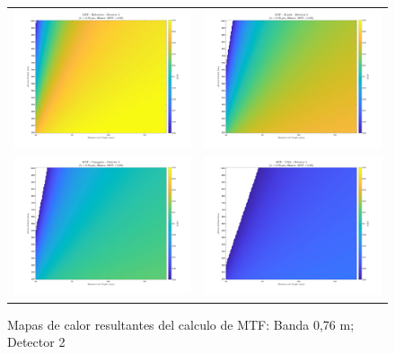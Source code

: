 \begin{landscape}
\begin{figure}[p]
\centering
\setlength{\tabcolsep}{2pt}
\renewcommand{\arraystretch}{0}

\begin{tabular}{cc}
\includegraphics[width=0.48\linewidth]{4.Payload/MTF/MTF_Lambda3_Detector5_Telescopio1_heatmap.jpg} &
\includegraphics[width=0.48\linewidth]{4.Payload/MTF/MTF_Lambda3_Detector5_Telescopio2_heatmap.jpg} \\
\includegraphics[width=0.48\linewidth]{4.Payload/MTF/MTF_Lambda3_Detector5_Telescopio3_heatmap.jpg} &
\includegraphics[width=0.48\linewidth]{4.Payload/MTF/MTF_Lambda3_Detector5_Telescopio4_heatmap.jpg} \\
\end{tabular}
\caption{Mapas de calor resultantes del calculo de MTF: Banda 0,76 \textmu m; Detector 2}
\end{figure}
\end{landscape}


